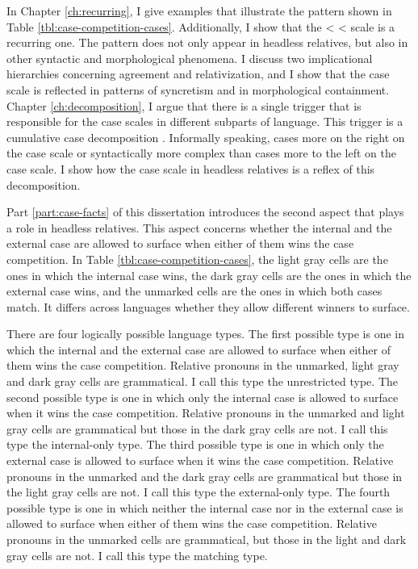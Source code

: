 In Chapter \ref{ch:recurring}, I give examples that illustrate the pattern shown in Table \ref{tbl:case-competition-cases}. Additionally, I show that the  <  <  scale is a recurring one. The pattern does not only appear in headless relatives, but also in other syntactic and morphological phenomena. I discuss two implicational hierarchies concerning agreement and relativization, and I show that the case scale is reflected in patterns of syncretism and in morphological containment.
Chapter \ref{ch:decomposition}, I argue that there is a single trigger that is responsible for the case scales in different subparts of language. This trigger is a cumulative case decomposition \citep{caha2009}. Informally speaking, cases more on the right on the case scale or syntactically more complex than cases more to the left on the case scale. I show how the case scale in headless relatives is a reflex of this decomposition.

Part \ref{part:case-facts} of this dissertation introduces the second aspect that plays a role in headless relatives. This aspect concerns whether the internal and the external case are allowed to surface when either of them wins the case competition. In Table \ref{tbl:case-competition-cases}, the light gray cells are the ones in which the internal case wins, the dark gray cells are the ones in which the external case wins, and the unmarked cells are the ones in which both cases match. It differs across languages whether they allow different winners to surface.

There are four logically possible language types. The first possible type is one in which the internal and the external case are allowed to surface when either of them wins the case competition. Relative pronouns in the unmarked, light gray and dark gray cells are grammatical. I call this type the unrestricted type. The second possible type is one in which only the internal case is allowed to surface when it wins the case competition. Relative pronouns in the unmarked and light gray cells are grammatical but those in the dark gray cells are not. I call this type the internal-only type. The third possible type is one in which only the external case is allowed to surface when it wins the case competition. Relative pronouns in the unmarked and the dark gray cells are grammatical but those in the light gray cells are not. I call this type the external-only type. The fourth possible type is one in which neither the internal case nor in the external case is allowed to surface when either of them wins the case competition. Relative pronouns in the unmarked cells are grammatical, but those in the light and dark gray cells are not. I call this type the matching type.


